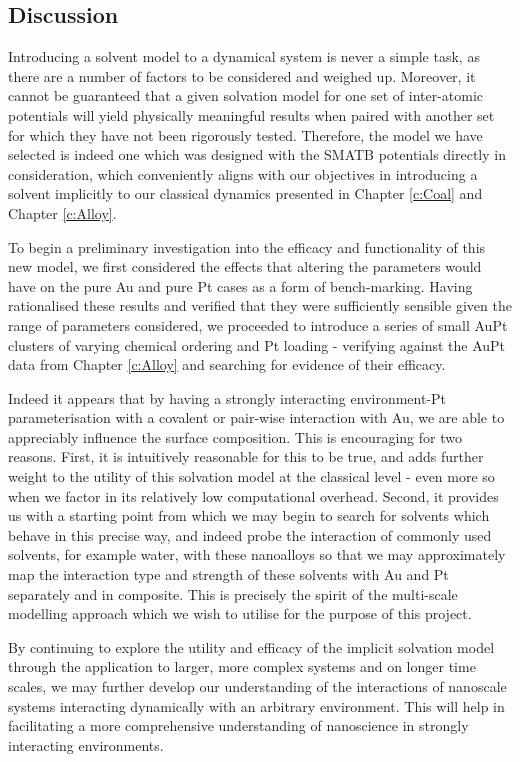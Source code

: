 \subsection{Discussion}

Introducing a solvent model to a dynamical system is never a simple task, as there are a number of factors to be considered and weighed up. Moreover, it cannot be guaranteed that a given solvation model for one set of inter-atomic potentials will yield physically meaningful results when paired with another set for which they have not been rigorously tested. Therefore, the model we have selected is indeed one which was designed with the SMATB potentials directly in consideration, which conveniently aligns with our objectives in introducing a solvent implicitly to our classical dynamics presented in Chapter \ref{c:Coal} and Chapter \ref{c:Alloy}.

To begin a preliminary investigation into the efficacy and functionality of this new model, we first considered the effects that altering the parameters would have on the pure Au and pure Pt cases as a form of bench-marking. Having rationalised these results and verified that they were sufficiently sensible given the range of parameters considered, we proceeded to introduce a series of small AuPt clusters of varying chemical ordering and Pt loading - verifying against the AuPt data from Chapter \ref{c:Alloy} and searching for evidence of their efficacy.

Indeed it appears that by having a strongly interacting environment-Pt parameterisation with a covalent or pair-wise interaction with Au, we are able to appreciably influence the surface composition. This is encouraging for two reasons. First, it is intuitively reasonable for this to be true, and adds further weight to the utility of this solvation model at the classical level - even more so when we factor in its relatively low computational overhead. Second, it provides us with a starting point from which we may begin to search for solvents which behave in this precise way, and indeed probe the interaction of commonly used solvents, for example water, with these nanoalloys so that we may approximately map the interaction type and strength of these solvents with Au and Pt separately and in composite. This is precisely the spirit of the multi-scale modelling approach which we wish to utilise for the purpose of this project.

By continuing to explore the utility and efficacy of the implicit solvation model through the application to larger, more complex systems and on longer time scales, we may further develop our understanding of the interactions of nanoscale systems interacting dynamically with an arbitrary environment. This will help in facilitating a more comprehensive understanding of nanoscience in strongly interacting environments.

